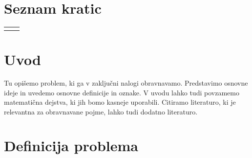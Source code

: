 \documentclass[12pt,a4paper,titlepage,openany]{report}
\begin{document}
\tableofcontents
{}
\newpage
\listoftables
{}
\newpage
\listoffigures
{}
\newpage
\renewcommand{\cftdot}{}
\listofappendices
\thispagestyle{fancy}
\newpage

\chapter*{Seznam kratic}
\thispagestyle{fancyplain}
\begin{longtable}{@{}p{1cm}@{}p{\dimexpr\textwidth-1cm\relax}@{}}
\nomenclature{$tj.$}{to je}
\nomenclature{$npr.$}{na primer}
\end{longtable}
\newpage

\normalsize


% 
% 

\chapter{Uvod}
\thispagestyle{fancy}

Tu opišemo problem, ki ga v zaključni nalogi obravnavamo. Predstavimo osnovne ideje in uvedemo
osnovne definicije in oznake. V uvodu lahko tudi povzamemo matematična dejstva, ki jih bomo
kasneje uporabili. Citiramo literaturo, ki je relevantna za obravnavane pojme, lahko tudi dodatno literaturo.

\chapter{Definicija problema}
\thispagestyle{fancy}
\end{document}
